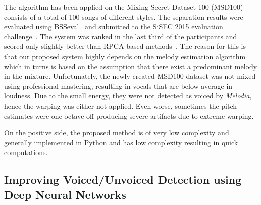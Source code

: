 The algorithm has been applied on the Mixing Secret Dataset 100 (MSD100) consists of a total of 100 songs of different styles.
The separation results were evaluated using BSSeval~\cite{todo} and submitted to the SiSEC 2015 evaluation challenge~\cite{ono15}.
The system was ranked in the last third of the participants and scored only slightly better than RPCA based methods~\cite{huang12}.
The reason for this is that our proposed system highly depends on the melody estimation algorithm which in turns is based on the assumption that there exist a predominant melody in the mixture.
Unfortunately, the newly created MSD100 dataset was not mixed using professional mastering, resulting in vocals that are below average in loudness.
Due to the small energy, they were not detected as voiced by \emph{Melodia}, hence the warping was either not applied. Even worse, sometimes the pitch estimates were one octave off producing severe artifacts due to extreme warping.\par
On the positive side, the proposed method is of very low complexity and generally implemented in Python and has low complexity resulting in quick computations.

\subsection{Improving Voiced/Unvoiced Detection using Deep Neural Networks}


